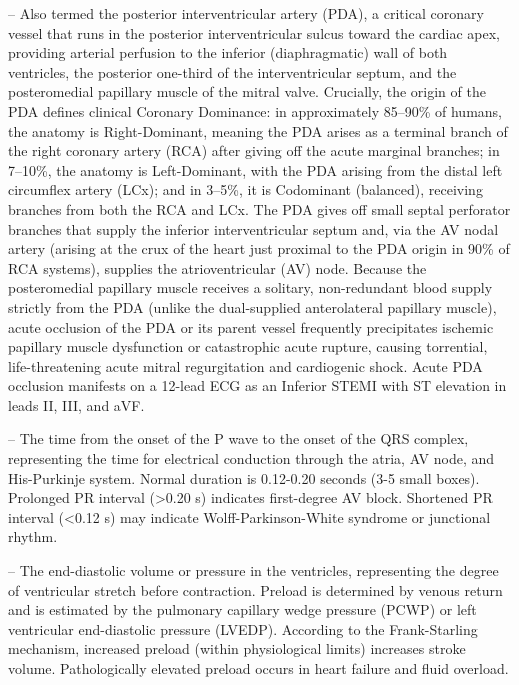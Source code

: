 -- Also termed the posterior interventricular artery (PDA), a critical coronary vessel that runs in the posterior interventricular sulcus toward the cardiac apex, providing arterial perfusion to the inferior (diaphragmatic) wall of both ventricles, the posterior one-third of the interventricular septum, and the posteromedial papillary muscle of the mitral valve. Crucially, the origin of the PDA defines clinical Coronary Dominance: in approximately 85--90\% of humans, the anatomy is Right-Dominant, meaning the PDA arises as a terminal branch of the right coronary artery (RCA) after giving off the acute marginal branches; in 7--10\%, the anatomy is Left-Dominant, with the PDA arising from the distal left circumflex artery (LCx); and in 3--5\%, it is Codominant (balanced), receiving branches from both the RCA and LCx. The PDA gives off small septal perforator branches that supply the inferior interventricular septum and, via the AV nodal artery (arising at the crux of the heart just proximal to the PDA origin in 90\% of RCA systems), supplies the atrioventricular (AV) node. Because the posteromedial papillary muscle receives a solitary, non-redundant blood supply strictly from the PDA (unlike the dual-supplied anterolateral papillary muscle), acute occlusion of the PDA or its parent vessel frequently precipitates ischemic papillary muscle dysfunction or catastrophic acute rupture, causing torrential, life-threatening acute mitral regurgitation and cardiogenic shock. Acute PDA occlusion manifests on a 12-lead ECG as an Inferior STEMI with ST elevation in leads II, III, and aVF.

-- The time from the onset of the P wave to the onset of the QRS complex, representing the time for electrical conduction through the atria, AV node, and His-Purkinje system. Normal duration is 0.12-0.20 seconds (3-5 small boxes). Prolonged PR interval (>0.20 s) indicates first-degree AV block. Shortened PR interval (<0.12 s) may indicate Wolff-Parkinson-White syndrome or junctional rhythm.

-- The end-diastolic volume or pressure in the ventricles, representing the degree of ventricular stretch before contraction. Preload is determined by venous return and is estimated by the pulmonary capillary wedge pressure (PCWP) or left ventricular end-diastolic pressure (LVEDP). According to the Frank-Starling mechanism, increased preload (within physiological limits) increases stroke volume. Pathologically elevated preload occurs in heart failure and fluid overload.

